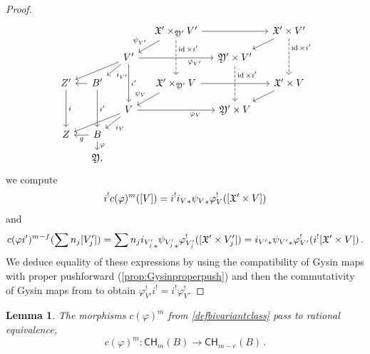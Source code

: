 \documentclass[a4paper,12pt]{article} %
\newcommand{\on}[1]{\operatorname{#1}}
\theoremstyle{definition}
\theoremstyle{plain}%
\newtheorem{lemma}[definition]{Lemma}
\renewcommand{\phi}{\varphi}
\newcommand{\Chow}{\mathsf{CH}}
\begin{document}
\begin{proof}
\begin{equation}
\begin{tikzcd}[column sep = small, row sep = small]
~ & ~ & ~  & \frak X' \times_{\frak Y'} {V'} 	\arrow[rr] \arrow[dd, dashed, near start, "\on{id} \times i'"] \arrow[dl, swap, "\psi_{V'}"] & ~ & \frak X' \times  {V'} \arrow[dl] \arrow[dd, dashed, near start, "\on{id} \times i'"]\\
~ & ~ & {V'}  \arrow[dll] \arrow[dl, "i_{V'}"] \arrow[rr, swap,near end, "\phi_{V'}"] \arrow[dd, "i'"]& ~ & \frak Y' \times {V'} \arrow[dd, dashed, near start, "\on{id} \times i'"] & ~ \\
Z' \arrow[dd,"i"] & B' \arrow[l] \arrow[dd, "i'"] & ~ & \frak X' \times_{\frak Y'} V \arrow[dl, swap, "\psi_V"] 	\arrow[rr] & ~ & \frak X' \times V \arrow[dl] \\
~ & ~ & V \arrow[dll] \arrow[dl, "i_V"] \arrow[rr, swap, near end, "\phi_V"] &~ & \frak Y' \times V & ~ \\
 Z & B \arrow[l, "g"] \arrow[d, "\phi"] &~ & ~ &~ & ~ \\
~ & \frak Y,  &~ & ~ &~ & ~ 
\end{tikzcd}
\end{equation}
we compute
\[i^! c(\phi)^m ([V]) = i^! {i_V}_* {\psi_V}_* \phi_V^! ( [\frak X' \times V]) \]
and
\[c(\phi i')^{m-f}(\sum n_j [V'_j]) = \sum n_j  {i_{V'_j}}_* {\psi_{V'_j}}_* \phi_{V'_j}^! ( [\frak X' \times V'_j]) =  {i_{V'}}_* {\psi_{V'}}_* \phi_{V'}^! ( i^![\frak X' \times V])\, . \]
We deduce equality of these expressions by using the compatibility of Gysin maps with proper pushforward (\cref{prop:Gysinproperpush}) and then the commutativity of Gysin maps from \cite{Kresch1999Cycle-groups-fo} to obtain $\phi_{V'}^!  i^! = i^! \phi_V^!$. 
\end{proof}

\begin{lemma}\label{lem:ratequiv}
The morphisms $c(\phi)^{m}$ from \cref{defbivariantclass} pass to rational equivalence, 
\[c(\phi)^{m}\colon \Chow_m(B) \to \Chow_{m-e}(B)\, .\]
\end{lemma}
\end{document}
